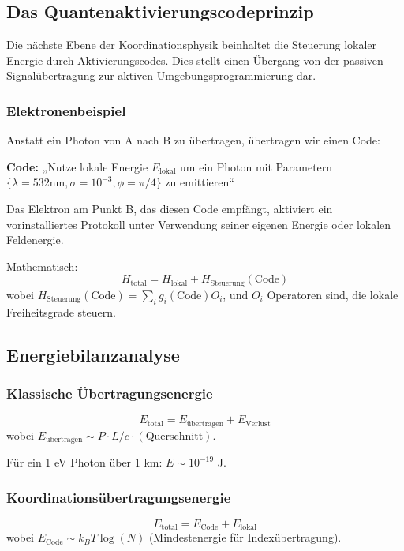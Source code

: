 \documentclass[11pt,a4paper]{article}
\begin{document}
	\subsection{Das Quantenaktivierungscodeprinzip}
	
	Die nächste Ebene der Koordinationsphysik beinhaltet die Steuerung lokaler Energie durch Aktivierungscodes. Dies stellt einen Übergang von der passiven Signalübertragung zur aktiven Umgebungsprogrammierung dar.
	
	\subsubsection{Elektronenbeispiel}
	Anstatt ein Photon von A nach B zu übertragen, übertragen wir einen Code:
	
	\textbf{Code:} „Nutze lokale Energie $E_{\text{lokal}}$ um ein Photon mit Parametern $\{\lambda=532\text{nm}, \sigma=10^{-3}, \phi=\pi/4\}$ zu emittieren“
	
	Das Elektron am Punkt B, das diesen Code empfängt, aktiviert ein vorinstalliertes Protokoll unter Verwendung seiner eigenen Energie oder lokalen Feldenergie.
	
	Mathematisch:
	\begin{equation}
		H_{\text{total}} = H_{\text{lokal}} + H_{\text{Steuerung}}(\text{Code})
	\end{equation}
	wobei $H_{\text{Steuerung}}(\text{Code}) = \sum_i g_i(\text{Code}) O_i$, und $O_i$ Operatoren sind, die lokale Freiheitsgrade steuern.
	
	\subsection{Energiebilanzanalyse}
	
	\subsubsection{Klassische Übertragungsenergie}
	\begin{equation}
		E_{\text{total}} = E_{\text{übertragen}} + E_{\text{Verlust}}
	\end{equation}
	wobei $E_{\text{übertragen}} \sim P \cdot L/c \cdot (\text{Querschnitt})$.
	
	Für ein 1 eV Photon über 1 km: $E \sim 10^{-19}$ J.
	
	\subsubsection{Koordinationsübertragungsenergie}
	\begin{equation}
		E_{\text{total}} = E_{\text{Code}} + E_{\text{lokal}}
	\end{equation}
	wobei $E_{\text{Code}} \sim k_B T \log(N)$ (Mindestenergie für Indexübertragung).
	
\end{document}
